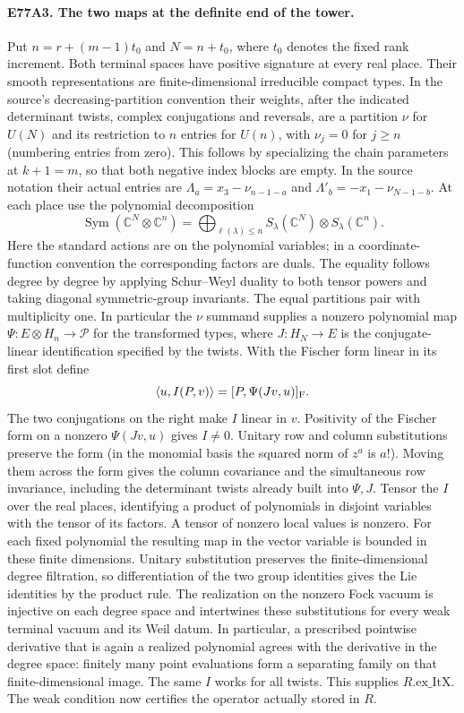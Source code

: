 \paragraph{E77A3. The two maps at the definite end of the tower.}
Put $n=r+(m-1)t_0$ and $N=n+t_0$, where $t_0$ denotes the fixed
rank increment. Both terminal spaces have positive signature at
every real place. Their smooth representations are finite-dimensional
irreducible compact types. In the source's decreasing-partition
convention their weights, after the indicated determinant twists,
complex conjugations and reversals, are a partition $\nu$ for $U(N)$
and its restriction to $n$ entries for $U(n)$, with $\nu_j=0$ for
$j\ge n$ (numbering entries from zero). This follows by specializing
the chain parameters at $k+1=m$, so that both negative index blocks
are empty. In the source notation their actual entries are
$\Lambda_a=x_3-\nu_{n-1-a}$ and
$\Lambda'_b=-x_1-\nu_{N-1-b}$. At each place use the polynomial decomposition
\[
 \operatorname{Sym}(\mathbb C^N\otimes\mathbb C^n)
   =\bigoplus_{\ell(\lambda)\le n}
       S_\lambda(\mathbb C^N)\otimes S_\lambda(\mathbb C^n).
\]
Here the standard actions are on the polynomial variables; in a
coordinate-function convention the corresponding factors are duals.
The equality follows degree by degree by applying Schur--Weyl duality
to both tensor powers and taking diagonal symmetric-group invariants.
The equal partitions pair with multiplicity one. In particular the
$\nu$ summand supplies a nonzero polynomial map
$\Psi:E\otimes H_n\to\mathcal P$ for the transformed types, where
$J:H_N\to E$ is the conjugate-linear identification specified by the
twists. With the Fischer form linear in its first slot define
\[
 \langle u,I(P,v)\rangle=[P,\Psi(Jv,u)]_{\rm F}.
\]
The two conjugations on the right make $I$ linear in $v$. Positivity
of the Fischer form on a nonzero $\Psi(Jv,u)$ gives $I\ne0$. Unitary
row and column substitutions preserve the form (in the monomial
basis the squared norm of $z^a$ is $a!$). Moving them across the form
gives the column covariance and the simultaneous row invariance,
including the determinant twists already built into $\Psi,J$.
Tensor the $I$ over the real places, identifying a product of
polynomials in disjoint variables with the tensor of its factors.
A tensor of nonzero local values is nonzero. For each fixed polynomial
the resulting map in the vector variable is bounded in these finite
dimensions. Unitary substitution preserves the finite-dimensional
degree filtration, so differentiation of the two group identities
gives the Lie identities by the product rule. The realization on the
nonzero Fock vacuum is injective on each degree space and intertwines
these substitutions for every weak terminal vacuum and its Weil
datum. In particular, a prescribed pointwise derivative that is again
a realized polynomial agrees with the derivative in the degree space:
finitely many point evaluations form a separating family on that
finite-dimensional image. The same $I$ works for all twists. This
supplies $R.\mathrm{ex\_ItX}$. The weak condition now certifies
the operator actually stored in $R$.

